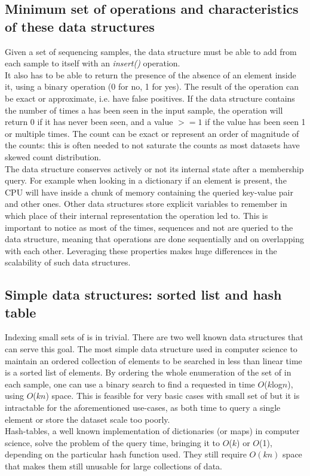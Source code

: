 \subsection{Minimum set of operations and characteristics of these data structures}
Given a set of sequencing samples, the data structure must be able to add \kmers from each sample to itself with an \emph{insert()} operation. \\
It also has to be able to return the presence of the absence of an element inside it, using a binary \memb operation (0 for no, 1 for yes). The result of the \memb operation can be exact or approximate, i.e. have false positives. If the data structure contains the number of times a \kmer has been seen in the input sample, the \memb operation will return 0 if it has never been seen, and a value $>= 1$ if the value has been seen 1 or multiple times. The count can be exact or represent an order of magnitude of the counts: this is often needed to not saturate the counts as most datasets have skewed \kmer count distribution. \\
The data structure conserves actively or not its internal state after a membership query. For example when looking in a dictionary if an element is present, the CPU will have inside a chunk of memory containing the queried key-value pair and other ones. Other data structures store explicit variables to remember in which place of their internal representation the \memb operation led to. This is important to notice as most of the times, sequences and not \kmers are queried to the data structure, meaning that \memb operations are done sequentially and on \kmers overlapping with each other. Leveraging these properties makes huge differences in the scalability of such data structures.


\subsection{Simple data structures: sorted list and hash table}
Indexing small sets of \kmers is in trivial. There are two well known data structures that can serve this goal.
The most simple data structure used in computer science to maintain an ordered collection of elements to be searched in less than linear time is a sorted list of elements. By ordering the whole enumeration of the set of \kmers in each sample, one can use a binary search to find a requested \kmer in time $O$($k$log$n$), using $O$($kn$) space. This is feasible for very basic cases with small set of \kmers but it is intractable for the aforementioned use-cases, as both time to query a single element or store the dataset scale too poorly.\\
Hash-tables, a well known implementation of dictionaries (or maps) in computer science, solve the problem of the query time, bringing it to $O$($k$) or $O$(1), depending on the particular hash function used. They still require $O(kn)$ space that makes them still unusable for large collections of data. 

